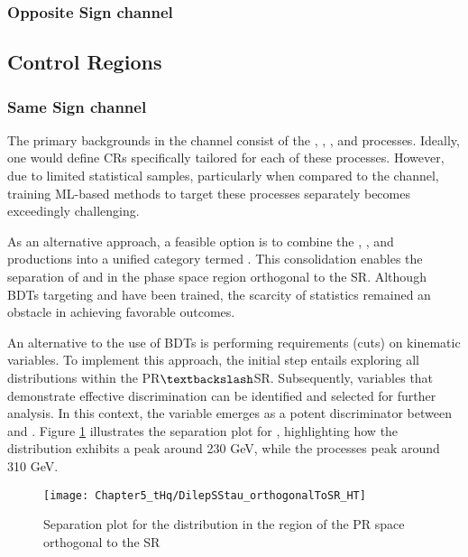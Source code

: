 \subsubsection{Opposite Sign channel}

\subsection{Control Regions}
\label{sec:ChaptH:EventSelection:CR}

\subsubsection{Same Sign channel}
The primary backgrounds in the \dilepSStau channel consist of the \ttbar, \ttW, \ttZ, and \ttH processes. 
Ideally, one would define CRs specifically tailored for each of these processes. However, due to limited 
statistical samples, particularly when compared to the \dilepOStau channel, training ML-based methods 
to target these processes separately becomes exceedingly challenging.

As an alternative approach, a feasible option is to combine the \ttW, \ttZ, and \ttH productions into a 
unified category termed \ttX. This consolidation enables the separation of \ttbar and \ttX in the phase 
space region orthogonal to the SR. Although BDTs targeting \ttbar and \ttX have been trained, the 
scarcity of statistics remained an obstacle in achieving favorable outcomes.

An alternative to the use of BDTs is performing requirements (cuts) on kinematic variables. 
To implement this approach, the initial step entails exploring all \dilepSStau distributions within 
the PR$\textbackslash $SR. Subsequently, variables that demonstrate effective \ttbar discrimination 
can be identified and selected for further analysis. In this context, the variable \HT emerges as a potent 
discriminator between \ttbar and \ttX. Figure \ref{fig:tHq:EventSelection:CR:SS:HT} illustrates the separation 
plot for \HT, highlighting how the \ttbar distribution exhibits a peak around 230 GeV, while the \ttX processes 
peak around 310 GeV.

\begin{figure}[htbp!]
\centering
\texttt{[image: Chapter5\_tHq/DilepSStau\_orthogonalToSR\_HT]}
\caption{Separation plot for the \HT distribution in the region of the PR space orthogonal to the SR}
\label{fig:tHq:EventSelection:CR:SS:HT}
\end{figure}

